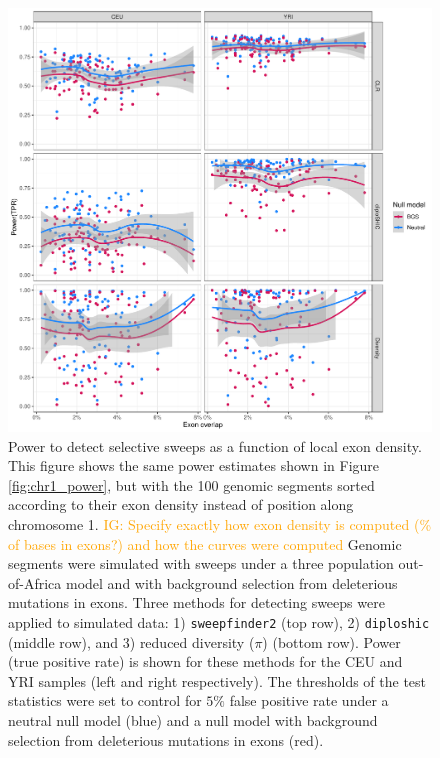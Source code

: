 \documentclass[hidelinks]{article}
\newcommand{\sweepfinder}{\texttt{sweepfinder2}\xspace}
\newcommand{\diploshic}{\texttt{diploshic}\xspace}
\newcommand{\igcomment}[1]{\textcolor{orange}{IG: #1}}
\begin{document}
\begin{figure}
    \centering
    \includegraphics[width=0.8 \textwidth]{figures/sweeps/relationship_power_exon.pdf}
    \caption{
        Power to detect selective sweeps as a function of local exon density.
        This figure shows the same power estimates shown in Figure \ref{fig:chr1_power},
        but with the 100 genomic segments sorted according to their
        exon density instead of position along chromosome 1.
        \igcomment{Specify exactly how exon density is computed (\% of bases in exons?) and how the curves were computed}
	Genomic segments were simulated with sweeps under a three population out-of-Africa model
        \citep{gutenkunst2009inferring} and with background selection from deleterious mutations in exons.
        Three methods for detecting sweeps were applied to simulated data:
        1) \sweepfinder \citep{degiorgio2016sweepfinder2} (top row),
        2) \diploshic \citep{kern2018diplos} (middle row),
        and 3) reduced diversity ($\pi$) (bottom row).
        Power (true positive rate) is shown for these methods for the CEU and YRI
        samples (left and right respectively).
        The thresholds of the test statistics were set to control for
        $5\%$ false positive rate under a neutral null model (blue)
        and a null model with background selection from deleterious mutations in exons (red).
    }
    \label{fig:power-exon}
\end{figure}
\end{document}
